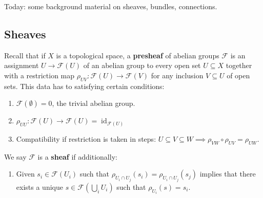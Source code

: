 Today: some background material on sheaves, bundles, connections.

\hypertarget{sheaves}{%
\subsection{Sheaves}\label{sheaves}}

\begin{definition}

Recall that if \(X\) is a topological space, a \textbf{presheaf} of
abelian groups \(\mathcal{F}\) is an assignment \(U\to \mathcal{F}(U)\)
of an abelian group to every open set \(U \subseteq X\) together with a
restriction map \(\rho_{UV}: \mathcal{F}(U) \to \mathcal{F}(V)\) for any
inclusion \(V \subseteq U\) of open sets. This data has to satisfying
certain conditions:

\begin{enumerate}
\def\labelenumi{\alph{enumi}.}
\item
  \(\mathcal{F}(\emptyset) = 0\), the trivial abelian group.
\item
  \(\rho_{UU}: \mathcal{F}(U) \to \mathcal{F}(U) = \operatorname{id}_{\mathcal{F}(U) }\)
\item
  Compatibility if restriction is taken in steps:
  \(U \subseteq V \subseteq W \implies \rho_{VW} \circ \rho_{UV} = \rho_{UW}\).
\end{enumerate}

We say \(\mathcal{F}\) is a \textbf{sheaf} if additionally:

\begin{enumerate}
\def\labelenumi{\alph{enumi}.}
\setcounter{enumi}{3}
\tightlist
\item
  Given \(s_i \in \mathcal{F}(U_i)\) such that
  \(\rho_{U_i \cap U_j} (s_i) = \rho_{U_i \cap U_j} (s_j)\) implies that
  there exists a unique \(s\in \mathcal{F}(\bigcup_i U_i)\) such that
  \(\rho_{U_i}(s) = s_i\).
\end{enumerate}

\begin{figure}
\centering
{}
\end{figure}

\end{definition}

